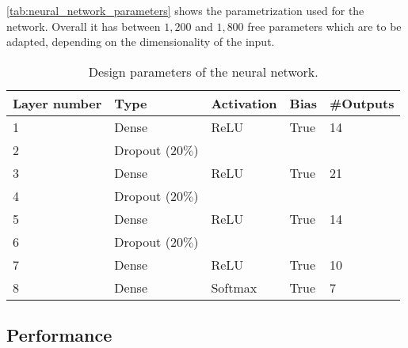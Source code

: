 \autoref{tab:neural_network_parameters} shows the parametrization used for the network. Overall it has between $1,200$ and $1,800$ free parameters which are to be adapted, depending on the dimensionality of the input.

\begin{table}[ht]
	\centering
	\begin{tabular}{l|llll}
		Layer number & Type & Activation & Bias & \#Outputs  \\
		\hline
		1 & Dense & ReLU & True & 14 \\
		2 & Dropout ($20\%$) \\
		3 & Dense & ReLU & True & 21 \\
		4 & Dropout ($20\%$) \\
		5 & Dense & ReLU & True & 14 \\
		6 & Dropout ($20\%$) \\
		7 & Dense & ReLU & True & 10 \\
		8 & Dense & Softmax & True & 7
	\end{tabular}
	\caption{Design parameters of the neural network.}
	\label{tab:neural_network_parameters}
\end{table}

\subsection{Performance}
\label{subsec:neural_network_performance}
